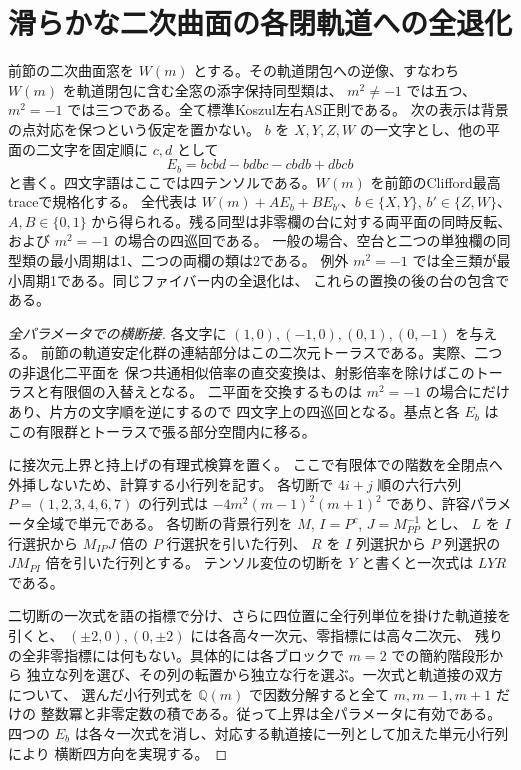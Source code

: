 \section{滑らかな二次曲面の各閉軌道への全退化}
\label{sec:quadric-attraction-fibers}
\begin{theorem}\label{thm:quadric-attraction-fibers}
前節の二次曲面窓を $W(m)$ とする。その軌道閉包への逆像、すなわち
$W(m)$ を軌道閉包に含む全窓の添字保持同型類は、
$m^2\ne-1$ では五つ、$m^2=-1$ では三つである。全て標準Koszul左右AS正則である。
次の表示は背景の点対応を保つという仮定を置かない。
$b$ を $X,Y,Z,W$ の一文字とし、他の平面の二文字を固定順に $c,d$ として
\[
 E_b=bcbd-bdbc-cbdb+dbcb
\]
と書く。四文字語はここでは四テンソルである。$W(m)$ を前節のClifford最高traceで規格化する。
全代表は $W(m)+A E_b+B E_{b'}$、$b\in\{X,Y\}$, $b'\in\{Z,W\}$、
$A,B\in\{0,1\}$ から得られる。残る同型は非零欄の台に対する両平面の同時反転、
および $m^2=-1$ の場合の四巡回である。
一般の場合、空台と二つの単独欄の同型類の最小周期は1、二つの両欄の類は2である。
例外 $m^2=-1$ では全三類が最小周期1である。同じファイバー内の全退化は、
これらの置換の後の台の包含である。
\end{theorem}
\begin{proof}[全パラメータでの横断接]
各文字に $(1,0),(-1,0),(0,1),(0,-1)$ を与える。
前節の軌道安定化群の連結部分はこの二次元トーラスである。実際、二つの非退化二平面を
保つ共通相似倍率の直交変換は、射影倍率を除けばこのトーラスと有限個の入替えとなる。
二平面を交換するものは $m^2=-1$ の場合にだけあり、片方の文字順を逆にするので
四文字上の四巡回となる。基点と各 $E_b$ はこの有限群とトーラスで張る部分空間内に移る。

 に接次元上界と持上げの有理式検算を置く。
ここで有限体での階数を全閉点へ外挿しないため、計算する小行列を記す。
各切断で $4i+j$ 順の六行六列 $P=(1,2,3,4,6,7)$ の行列式は
$-4m^2(m-1)^2(m+1)^2$ であり、許容パラメータ全域で単元である。
各切断の背景行列を $M$, $I=P^c$, $J=M_{PP}^{-1}$ とし、
$L$ を $I$ 行選択から $M_{IP}J$ 倍の $P$ 行選択を引いた行列、
$R$ を $I$ 列選択から $P$ 列選択の $JM_{PI}$ 倍を引いた行列とする。
テンソル変位の切断を $Y$ と書くと一次式は $LYR$ である。

二切断の一次式を語の指標で分け、さらに四位置に全行列単位を掛けた軌道接を引くと、
$(\pm2,0),(0,\pm2)$ には各高々一次元、零指標には高々二次元、
残りの全非零指標には何もない。具体的には各ブロックで $m=2$ での簡約階段形から
独立な列を選び、その列の転置から独立な行を選ぶ。一次式と軌道接の双方について、
選んだ小行列式を $\mathbb Q(m)$ で因数分解すると全て $m,m-1,m+1$ だけの
整数冪と非零定数の積である。従って上界は全パラメータに有効である。
四つの $E_b$ は各々一次式を消し、対応する軌道接に一列として加えた単元小行列により
横断四方向を実現する。
\end{proof}

